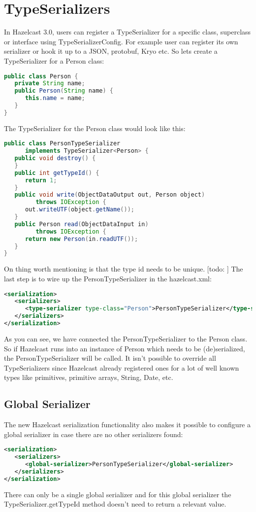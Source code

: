 \section{TypeSerializers}
In Hazelcast 3.0, users can register a TypeSerializer for a specific class, superclass or interface using TypeSerializerConfig. For example user can register its own serializer or hook it up to a JSON, protobuf, Kryo etc. So lets create a TypeSerializer for a Person class:
\begin{lstlisting}[language=java]
public class Person {
   private String name;
   public Person(String name) {
      this.name = name;
   }
}
\end{lstlisting}
The TypeSerializer for the Person class would look like this:
\begin{lstlisting}[language=java]
public class PersonTypeSerializer 
      implements TypeSerializer<Person> {
   public void destroy() {	  
   }
   public int getTypeId() {
      return 1;
   }
   public void write(ObjectDataOutput out, Person object) 
         throws IOException {
      out.writeUTF(object.getName());
   }
   public Person read(ObjectDataInput in) 
         throws IOException {
      return new Person(in.readUTF());
   }
}
\end{lstlisting}
On thing worth mentioning is that the type id needs to be unique. [todo: ] The last step is to wire up the PersonTypeSerializer in the hazelcast.xml:
\begin{lstlisting}[language=xml]
<serialization>
   <serializers>
      <type-serializer type-class="Person">PersonTypeSerializer</type-serializer>
   </serializers>
</serialization>
\end{lstlisting}
As you can see, we have connected the PersonTypeSerializer to the Person class. So if Hazelcast runs into an instance of Person which needs to be (de)serialized, the PersonTypeSerializer will be called. It isn't possible to override all TypeSerializers since Hazelcast already registered ones for a lot of well known types like primitives, primitive arrays, String, Date, etc.

\subsection{Global Serializer}
The new Hazelcast serialization functionality also makes it possible to configure a global serializer in case there are no other serializers found:
\begin{lstlisting}[language=xml]
<serialization>
   <serializers>
      <global-serializer>PersonTypeSerializer</global-serializer>
   </serializers>
</serialization>
\end{lstlisting}
There can only be a single global serializer and for this global serializer the TypeSerializer.getTypeId method doesn't need to return a relevant value.

